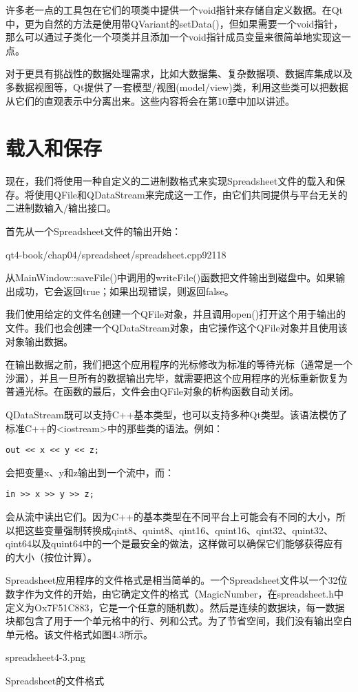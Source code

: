 \documentclass[11pt,oneside]{book}
\begin{document}
\begin{common-format}
\begin{framed}
许多老一点的工具包在它们的项类中提供一个void指针来存储自定义数据。在Qt中，更为自然的方法是使用带QVariant的setData()，但如果需要一个void指针，那么可以通过子类化一个项类并且添加一个void指针成员变量来很简单地实现这一点。

对于更具有挑战性的数据处理需求，比如大数据集、复杂数据项、数据库集成以及多数据视图等，Qt提供了一套模型/视图(model/view)类，利用这些类可以把数据从它们的直观表示中分离出来。这些内容将会在第10章中加以讲述。
\end{framed}


\section{载入和保存}
现在，我们将使用一种自定义的二进制数格式来实现Spreadsheet文件的载入和保存。将使用QFile和QDataStream来完成这一工作，由它们共同提供与平台无关的二进制数输入/输出接口。

首先从一个Spreadsheet文件的输出开始：

\begin{cppline}{qt4-book/chap04/spreadsheet/spreadsheet.cpp}{92}{118}
\end{cppline}

从MainWindow::saveFile()中调用的writeFile()函数把文件输出到磁盘中。如果输出成功，它会返回true；如果出现错误，则返回false。

我们使用给定的文件名创建一个QFile对象，并且调用open()打开这个用于输出的文件。我们也会创建一个QDataStream对象，由它操作这个QFile对象并且使用该对象输出数据。

在输出数据之前，我们把这个应用程序的光标修改为标准的等待光标（通常是一个沙漏），并且一旦所有的数据输出完毕，就需要把这个应用程序的光标重新恢复为普通光标。在函数的最后，文件会由QFile对象的析构函数自动关闭。 

QDataStream既可以支持C++基本类型，也可以支持多种Qt类型。该语法模仿了标准C++的<iostream>中的那些类的语法。例如：
\begin{Verbatim}
out << x << y << z;
\end{Verbatim}
会把变量x、y和z输出到一个流中，而：
\begin{Verbatim}
in >> x >> y >> z;
\end{Verbatim}
会从流中读出它们。因为C++的基本类型在不同平台上可能会有不同的大小，所以把这些变量强制转换成qint8、quint8、qint16、quint16、qint32、quint32、qint64以及quint64中的一个是最安全的做法，这样做可以确保它们能够获得应有的大小（按位计算）。 

Spreadsheet应用程序的文件格式是相当简单的。一个Spreadsheet文件以一个32位数字作为文件的开始，由它确定文件的格式（MagicNumber，在spreadsheet.h中定义为Ox7F51C883，它是一个任意的随机数）。然后是连续的数据块，每一数据块都包含了用于一个单元格中的行、列和公式。为了节省空间，我们没有输出空白单元格。该文件格式如图4.3所示。 
\begin{fig}[0.8]{spreadsheet4-3.png}
\caption{Spreadsheet的文件格式}
\label{fig:spreadsheet4-3.png}
\end{fig}


\end{common-format}
\end{document}
